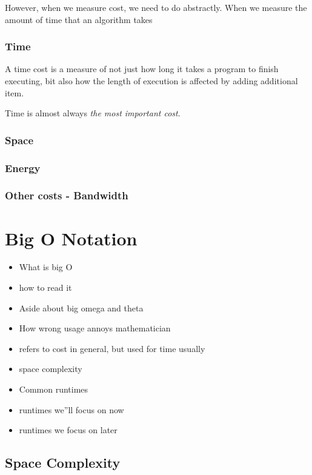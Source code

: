 \documentclass[10pt,a4paper]{book}
\begin{document}
However, when we measure cost, we need to do abstractly.  
When we measure the amount of time that an algorithm takes

\subsubsection{Time}
A time cost is a measure of not just how long it takes a program to finish executing, bit also how the length of execution is affected by adding additional item.

Time is almost always \emph{the most important cost}.

\subsubsection{Space}
\subsubsection{Energy}
\subsubsection{Other costs - Bandwidth}

\section{Big O Notation}

\begin{itemize}
	\item What is big O
	
	\item  how to read it
	\item Aside about big omega and theta
	\item How wrong usage annoys mathematician
	\item refers to cost in general, but used for time usually
	\item  space complexity 
	\item Common runtimes
	\item runtimes we''ll focus on now
	\item runtimes we focus on later
\end{itemize}



\subsection{Space Complexity}
\end{document}
